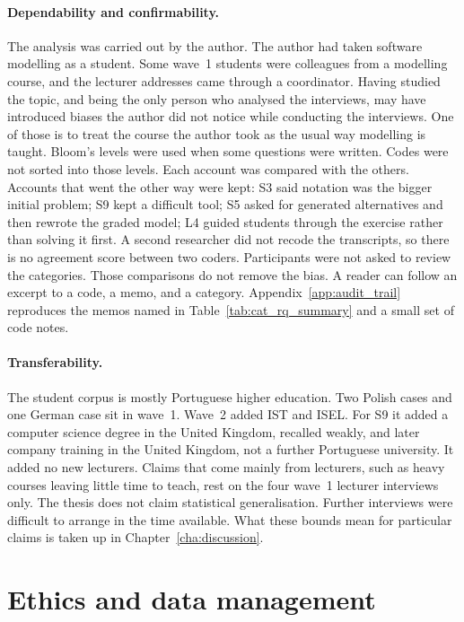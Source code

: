 \paragraph{Dependability and confirmability.}
The analysis was carried out by the author. The author had taken software modelling as a student. Some wave~1 students were colleagues from a modelling course, and the lecturer addresses came through a coordinator. Having studied the topic, and being the only person who analysed the interviews, may have introduced biases the author did not notice while conducting the interviews. One of those is to treat the course the author took as the usual way modelling is taught. Bloom's levels were used when some questions were written. Codes were not sorted into those levels. Each account was compared with the others. Accounts that went the other way were kept: S3 said notation was the bigger initial problem; S9 kept a difficult tool; S5 asked for generated alternatives and then rewrote the graded model; L4 guided students through the exercise rather than solving it first. A second researcher did not recode the transcripts, so there is no agreement score between two coders. Participants were not asked to review the categories. Those comparisons do not remove the bias. A reader can follow an excerpt to a code, a memo, and a category. Appendix~\ref{app:audit_trail} reproduces the memos named in Table~\ref{tab:cat_rq_summary} and a small set of code notes.

\paragraph{Transferability.}
The student corpus is mostly Portuguese higher education. Two Polish cases and one German case sit in wave~1. Wave~2 added IST and ISEL. For S9 it added a computer science degree in the United Kingdom, recalled weakly, and later company training in the United Kingdom, not a further Portuguese university. It added no new lecturers. Claims that come mainly from lecturers, such as heavy courses leaving little time to teach, rest on the four wave~1 lecturer interviews only. The thesis does not claim statistical generalisation. Further interviews were difficult to arrange in the time available. What these bounds mean for particular claims is taken up in Chapter~\ref{cha:discussion}.

\section{Ethics and data management}
\label{sec:method_ethics}

